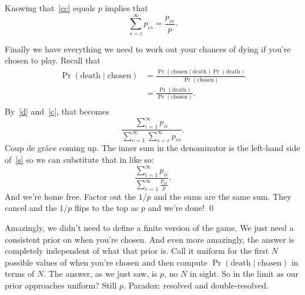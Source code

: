\documentclass[article,twocolumn]{memoir}
\begin{document}
Knowing that~\eqref{cc} equals $p$ implies that
\begin{equation}\label{s}
\sum\limits_{s=c}^\infty p_{cs} = \frac{p_{cc}}{p}.
\end{equation}

Finally we have everything we need to work out your chances of dying if you're chosen to play.
Recall that
\begin{align*}
\Pr(\text{death} \mid \text{chosen}) 
& = \frac{\Pr(\text{chosen} \mid \text{death}) \Pr(\text{death})}{\Pr(\text{chosen})} \\
& = \frac{\Pr(\text{death})}{\Pr(\text{chosen})}. \\
\end{align*}
By~\eqref{d} and~\eqref{c}, that becomes
$$
\frac{\sum\limits_{i=1}^\infty p_{ii}}{\sum\limits_{c=1}^\infty\sum\limits_{s=c}^\infty p_{cs}}.
$$
Coup de gr\^ace coming up.
The inner sum in the denominator is the left-hand side of~\eqref{s} so we can substitute that in like so:
$$
\frac{\sum\limits_{i=1}^\infty p_{ii}}{\sum\limits_{c=1}^\infty\frac{p_{cc}}{p}}.
$$
And we're home free.
Factor out the $1/p$ and the sums are the same sum.
They cancel and the $1/p$ flips to the top as $p$ and we're done! \qed

Amazingly, we didn't need to define a finite version of the game.
We just need a consistent prior on when you're chosen.
And even more amazingly, the answer is completely independent of what that prior is.
Call it uniform for the first $N$ possible values of when you're chosen and then compute 
$\Pr(\text{death}\mid\text{chosen})$ in terms of $N$.
The answer, as we just saw, is $p$, no $N$ in sight.
So in the limit as our prior approaches uniform?
Still $p$.
Paradox: resolved and double-resolved.
\end{document}
